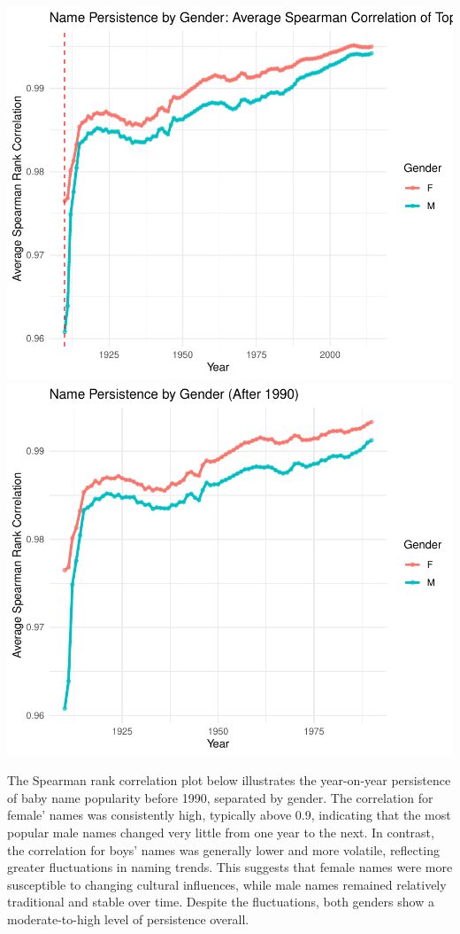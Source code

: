 \documentclass[11pt,preprint]{elsarticle}
\numberwithin{equation}{section}
\numberwithin{figure}{section}
\numberwithin{table}{section}
\begin{document}
\includegraphics{23034103_Q1USbabynames_files/figure-latex/unnamed-chunk-2-1.pdf}
\includegraphics{23034103_Q1USbabynames_files/figure-latex/unnamed-chunk-2-2.pdf}

The Spearman rank correlation plot below illustrates the year-on-year
persistence of baby name popularity before 1990, separated by gender.
The correlation for female' names was consistently high, typically above
0.9, indicating that the most popular male names changed very little
from one year to the next. In contrast, the correlation for boys' names
was generally lower and more volatile, reflecting greater fluctuations
in naming trends. This suggests that female names were more susceptible
to changing cultural influences, while male names remained relatively
traditional and stable over time. Despite the fluctuations, both genders
show a moderate-to-high level of persistence overall.
\end{document}
